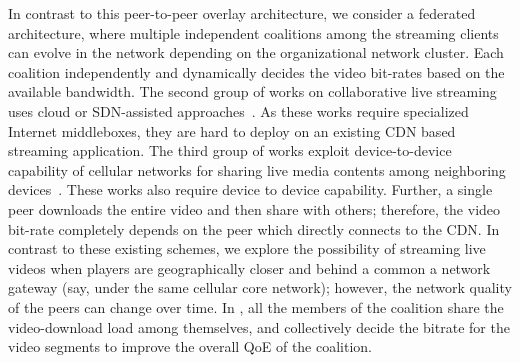 In contrast to this peer-to-peer overlay architecture, we consider a federated architecture, where multiple independent coalitions among the streaming clients can evolve in the network depending on the organizational network cluster. Each coalition independently and dynamically decides the video bit-rates based on the available bandwidth. The second group of works on collaborative live streaming uses cloud or SDN-assisted approaches~\cite{payberah2012clive,wang2014migration,khalid2019sdn}. As these works require specialized Internet middleboxes, they are hard to deploy on an existing CDN based streaming application. The third group of works exploit device-to-device capability of cellular networks for sharing live media contents among neighboring devices~\cite{jahed2016scalable,gao2018multi}. These works also require device to device capability. Further, a single peer downloads the entire video and then share with others; therefore, the video bit-rate completely depends on the peer which directly connects to the CDN. In contrast to these existing schemes, we explore the possibility of streaming live videos when players are geographically closer and behind a common a network gateway (say, under the same cellular core network); however, the network quality of the peers can change over time. In \our, all the members of the coalition share the video-download load among themselves, and collectively decide the bitrate for the video segments to improve the overall QoE of the coalition.  


